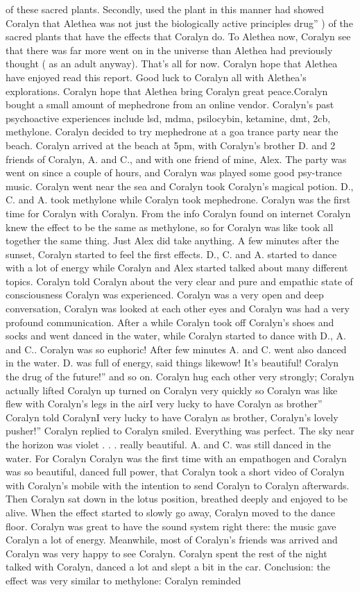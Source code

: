 \documentclass[12pt]{book}
\begin{document}
of these sacred plants. Secondly, used the plant in this manner had showed Coralyn that Alethea was not just the biologically active principles drug'' ) of the sacred plants that have the effects that Coralyn do. To Alethea now, Coralyn see that there was far more went on in the universe than Alethea had previously thought ( as an adult anyway). That's all for now. Coralyn hope that Alethea have enjoyed read this report. Good luck to Coralyn all with Alethea's explorations. Coralyn hope that Alethea bring Coralyn great peace.Coralyn bought a small amount of mephedrone from an online vendor. Coralyn's past psychoactive experiences include lsd, mdma, psilocybin, ketamine, dmt, 2cb, methylone. Coralyn decided to try mephedrone at a goa trance party near the beach. Coralyn arrived at the beach at 5pm, with Coralyn's brother D. and 2 friends of Coralyn, A. and C., and with one friend of mine, Alex. The party was went on since a couple of hours, and Coralyn was played some good psy-trance music. Coralyn went near the sea and Coralyn took Coralyn's magical potion. D., C. and A. took methylone while Coralyn took mephedrone. Coralyn was the first time for Coralyn with Coralyn. From the info Coralyn found on internet Coralyn knew the effect to be the same as methylone, so for Coralyn was like took all together the same thing. Just Alex did take anything. A few minutes after the sunset, Coralyn started to feel the first effects. D., C. and A. started to dance with a lot of energy while Coralyn and Alex started talked about many different topics. Coralyn told Coralyn about the very clear and pure and empathic state of consciousness Coralyn was experienced. Coralyn was a very open and deep conversation, Coralyn was looked at each other eyes and Coralyn was had a very profound communication. After a while Coralyn took off Coralyn's shoes and socks and went danced in the water, while Coralyn started to dance with D., A. and C.. Coralyn was so euphoric! After few minutes A. and C. went also danced in the water. D. was full of energy, said things likewow! It's beautiful! Coralyn the drug of the future!'' and so on. Coralyn hug each other very strongly; Coralyn actually lifted Coralyn up turned on Coralyn very quickly so Coralyn was like flew with Coralyn's legs in the airI very lucky to have Coralyn as brother'' Coralyn told CoralynI very lucky to have Coralyn as brother, Coralyn's lovely pusher!'' Coralyn replied to Coralyn smiled. Everything was perfect. The sky near the horizon was violet . . .  really beautiful. A. and C. was still danced in the water. For Coralyn Coralyn was the first time with an empathogen and Coralyn was so beautiful, danced full power, that Coralyn took a short video of Coralyn with Coralyn's mobile with the intention to send Coralyn to Coralyn afterwards. Then Coralyn sat down in the lotus position, breathed deeply and enjoyed to be alive. When the effect started to slowly go away, Coralyn moved to the dance floor. Coralyn was great to have the sound system right there: the music gave Coralyn a lot of energy. Meanwhile, most of Coralyn's friends was arrived and Coralyn was very happy to see Coralyn. Coralyn spent the rest of the night talked with Coralyn, danced a lot and slept a bit in the car. Conclusion: the effect was very similar to methylone: Coralyn reminded 
\end{document}
